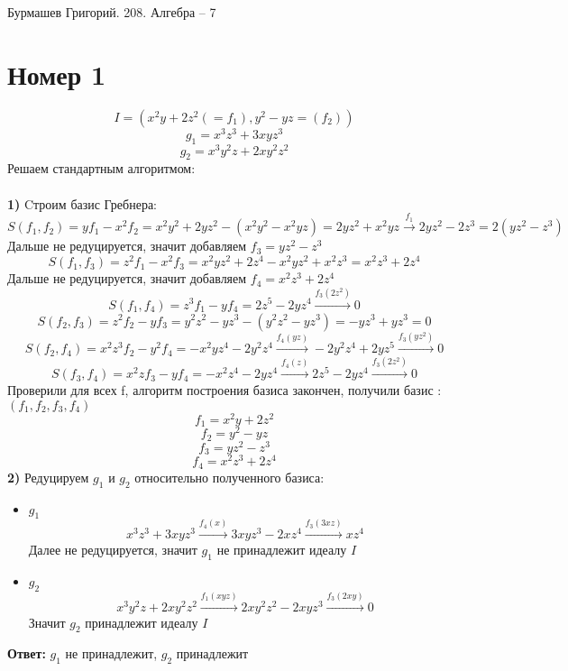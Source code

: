\documentclass[a4paper,12pt]{article}
\author{Бурмашев Григорий, БПМИ-208}
\title{}
\date{\today}
\begin{document}
\begin{center}
Бурмашев Григорий. 208. Алгебра -- 7
\end{center}
\section*{Номер 1}
\[
I = (x^2y + 2z^2 (= f_1), y^2 - yz = (f_2))
\]
\[
g_1 = x^3z^3 + 3xyz^3
\]
\[
g_2 = x^3y^2z + 2xy^2z^2
\]
Решаем стандартным алгоритмом:
\\\\
\textbf{1)} Cтроим базис Гребнера:
\[
S(f_1, f_2) = yf_1 - x^2f_2 = x^2y^2 + 2yz^2 - (x^2y^2 - x^2yz) =2yz^2+x^2yz \overset{f_1}{\rightarrow} 2yz^2 - 2z^3 = 2(yz^2 - z^3)
\]
Дальше не редуцируется, значит добавляем $f_3 = yz^2 - z^3$
\[
S(f_1, f_3) = z^2f_1 - x^2 f_3 = x^2yz^2 + 2z^4 - x^2yz^2 + x^2z^3 = x^2z^3+2z^4
\]
Дальше не редуцируется, значит добавляем $f_4 = x^2z^3 + 2z^4$
\[
S(f_1, f_4) = z^3 f_1 - yf_4 = 2z^5 - 2yz^4 \overset{f_3(2z^2)}{\rightarrow} 0
\]
\[
S(f_2, f_3) = z^2 f_2 - y f_3 = y^2z^2 - yz^3 - (y^2z^2 - yz^3) = -yz^3 + yz^3 = 0
\]
\[
S(f_2, f_4) = x^2z^3 f_2 - y^2 f_4 = -x^2 y z^4 - 2 y^2 z^4 \overset{f_4(yz)}{\rightarrow}-2 y^2 z^4 + 2 y z^5 \overset{f_3(yz^2)}{\rightarrow} 0
\]
\[
S(f_3, f_4) = x^2z f_3 - yf_4 = -x^2 z^4 - 2 y z^4 \overset{f_4(z)}{\rightarrow} 2z^5 -2yz^4 \overset{f_3(2z^2)}{\rightarrow} 0
\]
Проверили для всех f, алгоритм построения базиса закончен, получили базис : $(f_1, f_2, f_3, f_4)$
\[
f_1 = x^2y + 2z^2
\]
\[
f_2 = y^2 - yz
\]
\[
f_3 = yz^2 - z^3
\]
\[
f_4 = x^2z^3 + 2z^4
\]
\clearpage
\textbf{2)} Редуцируем $g_1$ и $g_2$ относительно полученного базиса:
\begin{itemize}
\item $g_1$
\[
x^3z^3 + 3xyz^3 \overset{f_4(x)}{\rightarrow} 3xyz^3 - 2xz^4 \overset{f_3(3xz)}{\rightarrow} xz^4
\]
Далее не редуцируется, значит $g_1$ не принадлежит идеалу $I$
\item $g_2$
\[
x^3y^2z + 2xy^2z^2 \overset{f_1(xyz)}{\rightarrow} 2 x y^2 z^2 - 2 x y z^3 \overset{f_3(2xy)}{\rightarrow} 0
\]
Значит $g_2$ принадлежит идеалу $I$
\end{itemize}
\begin{center}
\textbf{Ответ: } $g_1$ не принадлежит, $g_2$ принадлежит
\end{center}
\clearpage
\end{document}
